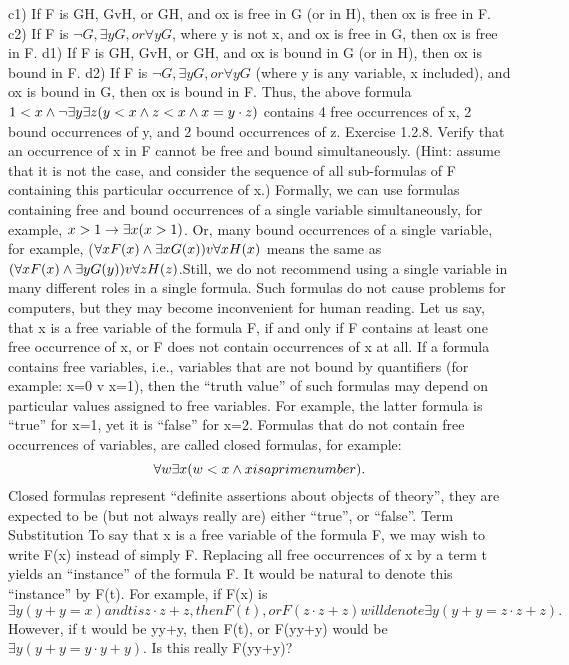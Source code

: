 c1) If F is G\AND H, GvH, or G\IMPLIES H, and ox is free in G (or in H), then ox is free in F.
c2) If F is \(\neg G, \exists yG, or \forall yG\), where y is not x, and ox is free in G, then ox is free in F.
d1) If F is G\AND H, GvH, or G\IMPLIES H, and ox is bound in G (or in H), then ox is bound in F.
d2) If F is \(\neg G, \exists yG, or \forall yG\) (where y is any variable, x included), and ox is bound in G, then ox is bound
in F.
Thus, the above formula \(1<x \wedge  \neg \exists y\exists z(y<x \wedge  z<x \wedge  x=y\cdot z)\) contains 4 free occurrences of x, 2 bound
occurrences of y, and 2 bound occurrences of z.
Exercise 1.2.8. Verify that an occurrence of x in F cannot be free and bound simultaneously. (Hint:
assume that it is not the case, and consider the sequence of all sub-formulas of F containing this particular
occurrence of x.)
Formally, we can use formulas containing free and bound occurrences of a single variable simultaneously,
for example, \(x>1\rightarrow \exists x(x>1)\). Or, many bound occurrences of a single variable, for example, (\(\forall xF(x) \wedge 
\exists xG(x)) v \forall xH(x)\) means the same as \((\forall xF(x) \wedge  \exists yG(y)) v \forall zH(z) \).Still, we do not recommend using a
single variable in many different roles in a single formula. Such formulas do not cause problems for computers, but they may become inconvenient for human reading.
Let us say, that x is a free variable of the formula F, if and only if F contains at least one free occurrence
of x, or F does not contain occurrences of x at all.
If a formula contains free variables, i.e., variables that are not bound by quantifiers (for example: x=0 v
x=1), then the ``truth value'' of such formulas may depend on particular values assigned to free variables.
For example, the latter formula is ``true'' for x=1, yet it is ``false'' for x=2. Formulas that do not contain
free occurrences of variables, are called closed formulas, for example:
\[\forall w\exists x( w<x \wedge  x is a prime number).\]
Closed formulas represent ``definite assertions about objects of theory'', they are expected to be (but not
always really are) either ``true'', or ``false''.
Term Substitution
To say that x is a free variable of the formula F, we may wish to write F(x) instead of simply F. Replacing
all free occurrences of x by a term t yields an ``instance'' of the formula F. It would be natural to denote
this ``instance'' by F(t).
For example, if F(x) is \(\exists y(y+y=x) and t is z\cdot z+z, then F(t), or F(z\cdot z+z) will denote \exists y(y+y=z\cdot z+z).\)
However, if t would be y\cdot y+y, then F(t), or F(y\cdot y+y) would be \(\exists y(y+y=y\cdot y+y)\). Is this really F(y\cdot y+y)?
